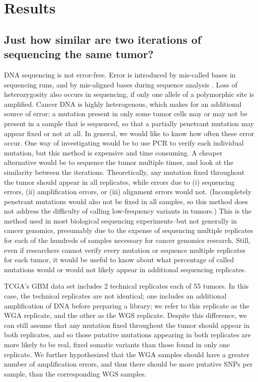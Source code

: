 \documentclass[11pt]{article} %
\begin{document}
\section*{Results}

\subsection*{Just how similar are two iterations of sequencing the same tumor?}


DNA sequencing is not error-free. Error is introduced by mis-called bases in sequencing runs, and by mis-aligned bases during sequence analysis \citep{seqerror}. Loss of heterozygosity also occurs in sequencing, if only one allele of a polymorphic site is amplified. Cancer DNA is highly heterogenous, which makes for an additional source of error: a mutation present in only some tumor cells may or may not be present in a sample that is sequenced, so that a partially penetrant mutation may appear fixed or not at all. In general, we would like to know how often these error occur. One way of investigating would be to use PCR to verify each individual mutation, but this method is expensive and time consuming. A cheaper alternative would be to sequence the tumor multiple times, and look at the similarity between the iterations. Theoretically, any mutation fixed throughout the tumor should appear in all replicates, while errors due to (i) sequencing errors, (ii) amplification errors, or (iii) alignment errors would not. (Incompletely penetrant mutations would also not be fixed in all samples, so this method does not address the difficulty of calling low-frequency variants in tumors.) This is the method used in most biological sequencing experiments--but not generally in cancer genomics, presumably due to the expense of sequencing multiple replicates for each of the hundreds of samples necessary for cancer genomics research. Still, even if researchers cannot verify every mutation or sequence multiple replicates for each tumor, it would be useful to know about what percentage of called mutations would or would not likely appear in additional sequencing replicates.

TCGA's GBM data set includes 2 technical replicates each of 55 tumors. In this case, the technical replicates are not identical; one includes an additional amplification of DNA before preparing a library; we refer to this replicate as the WGA replicate, and the other as the WGS replicate. Despite this difference, we can still assume that any mutation fixed throughout the tumor should appear in both replicates, and so those putative mutations appearing in both replicates are more likely to be real, fixed somatic variants than those found in only one replicate. We further hypothesized that the WGA samples should have a greater number of amplification errors, and thus there should be more putative SNPs per sample, than the corresponding WGS samples. 
\end{document}
